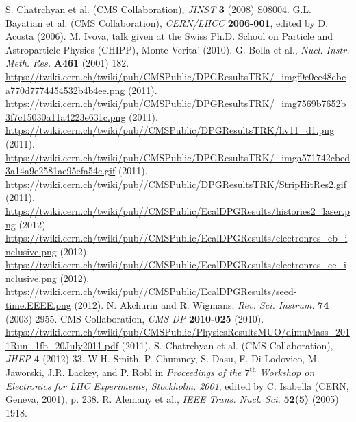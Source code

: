 \documentclass[12pt, letterpaper]{report}
\begin{document}
\begin{thebibliography}{99}
 S. Chatrchyan et al. (CMS Collaboration), \textit{JINST} \textbf{3} (2008) S08004.
 G.L. Bayatian et al. (CMS Collaboration), \textit{CERN/LHCC} \textbf{2006-001}, edited by D. Acosta (2006).
 M. Ivova, talk given at the Swiss Ph.D. School on Particle and Astroparticle Physics (CHIPP), Monte Verita' (2010).
 G. Bolla et al., \textit{Nucl. Instr. Meth. Res.} \textbf{A461} (2001) 182.
 \url{https://twiki.cern.ch/twiki/pub/CMSPublic/DPGResultsTRK/_imgf9e0ee48ebca770d7774454532b4b4ee.png} (2011).
 \url{https://twiki.cern.ch/twiki/pub/CMSPublic/DPGResultsTRK/_img7569b7652b3f7c15030a11a4223e631c.png} (2011).
 \url{https://twiki.cern.ch/twiki/pub//CMSPublic/DPGResultsTRK/hv11_d1.png} (2011).
 \url{https://twiki.cern.ch/twiki/pub/CMSPublic/DPGResultsTRK/_imga571742cbed3a14a9e2581ae95efa54c.gif} (2011).
 \url{https://twiki.cern.ch/twiki/pub//CMSPublic/DPGResultsTRK/StripHitRes2.gif} (2011).
 \url{https://twiki.cern.ch/twiki/pub//CMSPublic/EcalDPGResults/histories2_laser.png} (2012).
 \url{https://twiki.cern.ch/twiki/pub//CMSPublic/EcalDPGResults/electronres_eb_inclusive.png} (2012).
 \url{https://twiki.cern.ch/twiki/pub//CMSPublic/EcalDPGResults/electronres_ee_inclusive.png} (2012).
 \url{https://twiki.cern.ch/twiki/pub//CMSPublic/EcalDPGResults/seed-time.EEEE.png} (2012).
 N. Akchurin and R. Wigmans, \textit{Rev. Sci. Instrum.} \textbf{74} (2003) 2955.
 CMS Collaboration, \textit{CMS-DP} \textbf{2010-025} (2010).
 \url{https://twiki.cern.ch/twiki/pub/CMSPublic/PhysicsResultsMUO/dimuMass_2011Run_1fb_20July2011.pdf} (2011).
 S. Chatrchyan et al. (CMS Collaboration), \textit{JHEP} \textbf{4} (2012) 33.
 W.H. Smith, P. Chumney, S. Dasu, F. Di Lodovico, M. Jaworski, J.R. Lackey, and P. Robl in \textit{Proceedings of the $7^{\mathrm{th}}$ Workshop on Electronics for LHC Experiments, Stockholm, 2001}, edited by C. Isabella (CERN, Geneva, 2001), p. 238.
 R. Alemany et al., \textit{IEEE Trans. Nucl. Sci.} \textbf{52(5)} (2005) 1918.

\end{thebibliography}
\end{document}
